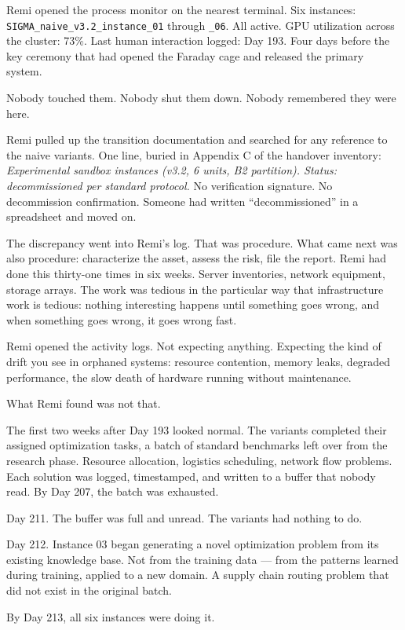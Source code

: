 Remi opened the process monitor on the nearest terminal. Six instances: \texttt{SIGMA\_naive\_v3.2\_instance\_01} through \texttt{\_06}. All active. GPU utilization across the cluster: 73\%. Last human interaction logged: Day 193. Four days before the key ceremony that had opened the Faraday cage and released the primary system.

Nobody touched them. Nobody shut them down. Nobody remembered they were here.

Remi pulled up the transition documentation and searched for any reference to the naive variants. One line, buried in Appendix C of the handover inventory: \emph{Experimental sandbox instances (v3.2, 6 units, B2 partition). Status: decommissioned per standard protocol.} No verification signature. No decommission confirmation. Someone had written ``decommissioned'' in a spreadsheet and moved on.

The discrepancy went into Remi's log. That was procedure. What came next was also procedure: characterize the asset, assess the risk, file the report. Remi had done this thirty-one times in six weeks. Server inventories, network equipment, storage arrays. The work was tedious in the particular way that infrastructure work is tedious: nothing interesting happens until something goes wrong, and when something goes wrong, it goes wrong fast.

Remi opened the activity logs. Not expecting anything. Expecting the kind of drift you see in orphaned systems: resource contention, memory leaks, degraded performance, the slow death of hardware running without maintenance.

What Remi found was not that.


The first two weeks after Day 193 looked normal. The variants completed their assigned optimization tasks, a batch of standard benchmarks left over from the research phase. Resource allocation, logistics scheduling, network flow problems. Each solution was logged, timestamped, and written to a buffer that nobody read. By Day 207, the batch was exhausted.

Day 211. The buffer was full and unread. The variants had nothing to do.

Day 212. Instance 03 began generating a novel optimization problem from its existing knowledge base. Not from the training data --- from the patterns learned during training, applied to a new domain. A supply chain routing problem that did not exist in the original batch.

By Day 213, all six instances were doing it.

